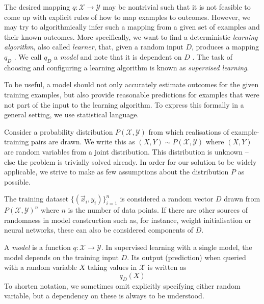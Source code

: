 \documentclass[
    a4paper, %
	fontsize=10pt, %
	twoside=false, %
]{kaobook}
\begin{document}
The desired mapping $q: \mathcal{X} \to \mathcal{Y}$ may be nontrivial such that it is not feasible to come up with explicit rules of how to map examples to outcomes. However, we may try to algorithmically infer such a mapping from a given set of examples and their known outcomes. More specifically, we want to find a deterministic \textit{learning algorithm}, also called \textit{learner}, that, given a random input $D$, produces a mapping $q_D$
.
We call $q_D$ a \textit{model} and note that it is dependent on $D$ .
The task of choosing and configuring a learning algorithm is known as \textit{supervised learning}.

To be useful, a model should not only accurately estimate outcomes for the given training examples, but also provide reasonable predictions for examples that were not part of the input to the learning algorithm. To express this formally in a general setting, we use statistical language.

Consider a probability distribution $P(\mathcal{X}, \mathcal{Y})$ from which realisations of example-training pairs are drawn. We write this as $(X, Y) \sim P(\mathcal{X}, \mathcal{Y})$ where $(X,Y)$ are random variables from a joint distribution.
This distribution is unknown -- else the problem is trivially solved already. In order for our solution to be widely applicable, we strive to make as few assumptions about the distribution $P$ as possible. 

The training dataset $\{ (\vec{x}_{i}, y_{i}) \}_{i=1}^n$ is considered a random vector $D$ drawn from $P(\mathcal{X}, \mathcal{Y})^n$ where $n$ is the number of data points. If there are other sources of randomness in model construction such as, for instance, weight initialisation or neural networks, these can also be considered components of $D$.

\begin{definition}
A \textit{model} is a function $q: \mathcal{X} \to \mathcal{Y}$. In supervised learning with a single model, the model depends on the training input $D$. Its output (prediction) when queried with a random variable $X$ taking values in $\mathcal{X}$ is written as
$$
q_{D}(X)
$$
To shorten notation, we sometimes omit explicitly specifying either random variable, but a dependency on these is always to be understood.
\end{definition}
\end{document}

